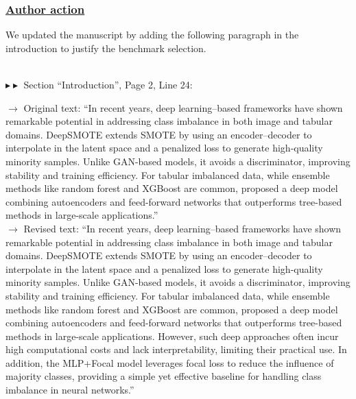 \documentclass[journal,12pn, onecolumn]{IEEEtran}
\begin{document}
{{{{\color{black}
\subsubsection*{\textbf{\underline{Author action}}}
We updated the manuscript by adding the following paragraph in the introduction to justify the benchmark selection.
}\\

$\blacktriangleright\blacktriangleright$ Section ``Introduction'', Page 2,  Line 24:\\
\par

{\color{black}$\longrightarrow$ Original text: ``In recent years, deep learning–based frameworks have shown remarkable potential in addressing class imbalance in both image and tabular domains. DeepSMOTE \cite{dablain2022deepsmote} extends SMOTE by using an encoder–decoder to interpolate in the latent space and a penalized loss to generate high-quality minority samples. Unlike GAN-based models, it avoids a discriminator, improving stability and training efficiency. For tabular imbalanced data, while ensemble methods like random forest and XGBoost are common, \cite{farhang2024deep} proposed a deep model combining autoencoders and feed-forward networks that outperforms tree-based methods in large-scale applications.''}\\

{\color{orange}$\longrightarrow$ Revised text: ``In recent years, deep learning–based frameworks have shown remarkable potential in addressing class imbalance in both image and tabular domains. DeepSMOTE \cite{dablain2022deepsmote} extends SMOTE by using an encoder–decoder to interpolate in the latent space and a penalized loss to generate high-quality minority samples. Unlike GAN-based models, it avoids a discriminator, improving stability and training efficiency. For tabular imbalanced data, while ensemble methods like random forest and XGBoost are common, \cite{farhang2024deep} proposed a deep model combining autoencoders and feed-forward networks that outperforms tree-based methods in large-scale applications. However, such deep approaches often incur high computational costs and lack interpretability, limiting their practical use. In addition, the MLP+Focal model \cite{lin2017focal} leverages focal loss to reduce the influence of majority classes, providing a simple yet effective baseline for handling class imbalance in neural networks.''}\\


}}}
\end{document}
